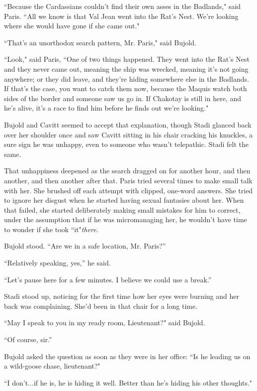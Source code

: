 \documentclass[twoside,letterpaper,12pt]{memoir}
\begin{document}
``Because the Cardassians couldn't find their own asses in the Badlands," said Paris. ``All we know is that Val Jean went into the Rat's Nest. We're looking where she would have gone if she came out."

``That's an unorthodox search pattern, Mr. Paris," said Bujold.

``Look," said Paris, ``One of two things happened. They went into the Rat's Nest and they never came out, meaning the ship was wrecked, meaning it's not going anywhere; or they did leave, and they're hiding somewhere else in the Badlands. If that's the case, you want to catch them now, because the Maquis watch both sides of the border and someone saw us go in. If Chakotay is still in here, and he's alive, it's a race to find him before he finds out we're looking."

Bujold and Cavitt seemed to accept that explanation, though Stadi glanced back over her shoulder once and saw Cavitt sitting in his chair cracking his knuckles, a sure sign he was unhappy, even to someone who wasn’t telepathic. Stadi felt the same.

That unhappiness deepened as the search dragged on for another hour, and then another, and then another after that. Paris tried several times to make small talk with her. She brushed off each attempt with clipped, one-word answers. She tried to ignore her disgust when he started having sexual fantasies about her. When that failed, she started deliberately making small mistakes for him to correct, under the assumption that if he was micromanaging her, he wouldn't have time to wonder if she took ``it"\textit{there}.

Bujold stood. ``Are we in a safe location, Mr. Paris?''

``Relatively speaking, yes,'' he said.

``Let’s pause here for a few minutes. I believe we could use a break.''

Stadi stood up, noticing for the first time how her eyes were burning and her back was complaining. She’d been in that chair for a long time.

``May I speak to you in my ready room, Lieutenant?" said Bujold.

``Of course, sir.''

Bujold asked the question as soon as they were in her office: ``Is he leading us on a wild-goose chase, lieutenant?"

``I don't...if he is, he is hiding it well. Better than he's hiding his other thoughts."
\end{document}
